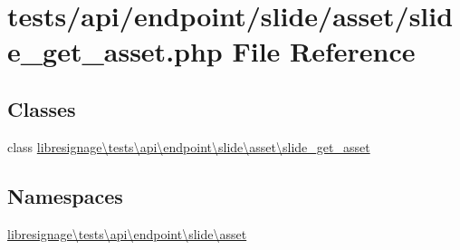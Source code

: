 \hypertarget{tests_2api_2endpoint_2slide_2asset_2slide__get__asset_8php}{}\section{tests/api/endpoint/slide/asset/slide\+\_\+get\+\_\+asset.php File Reference}
\label{tests_2api_2endpoint_2slide_2asset_2slide__get__asset_8php}
\subsection*{Classes}
\begin{DoxyCompactItemize}
\item 
class \hyperlink{classlibresignage_1_1tests_1_1api_1_1endpoint_1_1slide_1_1asset_1_1slide__get__asset}{libresignage\textbackslash{}tests\textbackslash{}api\textbackslash{}endpoint\textbackslash{}slide\textbackslash{}asset\textbackslash{}slide\+\_\+get\+\_\+asset}
\end{DoxyCompactItemize}
\subsection*{Namespaces}
\begin{DoxyCompactItemize}
\item 
 \hyperlink{namespacelibresignage_1_1tests_1_1api_1_1endpoint_1_1slide_1_1asset}{libresignage\textbackslash{}tests\textbackslash{}api\textbackslash{}endpoint\textbackslash{}slide\textbackslash{}asset}
\end{DoxyCompactItemize}
